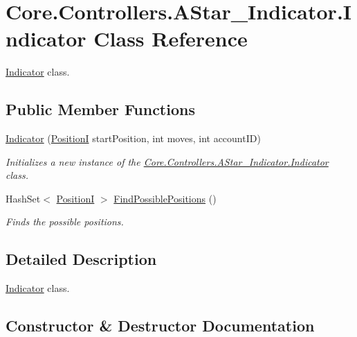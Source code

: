 \hypertarget{classCore_1_1Controllers_1_1AStar__Indicator_1_1Indicator}{}\section{Core.\+Controllers.\+A\+Star\+\_\+\+Indicator.\+Indicator Class Reference}
\label{classCore_1_1Controllers_1_1AStar__Indicator_1_1Indicator}


\hyperlink{classCore_1_1Controllers_1_1AStar__Indicator_1_1Indicator}{Indicator} class.  


\subsection*{Public Member Functions}
\begin{DoxyCompactItemize}
\item 
\hyperlink{classCore_1_1Controllers_1_1AStar__Indicator_1_1Indicator_ab67635c88015a0e2513c1455798db263}{Indicator} (\hyperlink{classCore_1_1Models_1_1PositionI}{Position\+I} start\+Position, int moves, int account\+I\+D)
\begin{DoxyCompactList}\small\item\em Initializes a new instance of the \hyperlink{classCore_1_1Controllers_1_1AStar__Indicator_1_1Indicator}{Core.\+Controllers.\+A\+Star\+\_\+\+Indicator.\+Indicator} class. \end{DoxyCompactList}\item 
Hash\+Set$<$ \hyperlink{classCore_1_1Models_1_1PositionI}{Position\+I} $>$ \hyperlink{classCore_1_1Controllers_1_1AStar__Indicator_1_1Indicator_ae5e691cd80d3ec3879d2d48237743d9c}{Find\+Possible\+Positions} ()
\begin{DoxyCompactList}\small\item\em Finds the possible positions. \end{DoxyCompactList}\end{DoxyCompactItemize}


\subsection{Detailed Description}
\hyperlink{classCore_1_1Controllers_1_1AStar__Indicator_1_1Indicator}{Indicator} class. 



\subsection{Constructor \& Destructor Documentation}
\hypertarget{classCore_1_1Controllers_1_1AStar__Indicator_1_1Indicator_ab67635c88015a0e2513c1455798db263}{}
